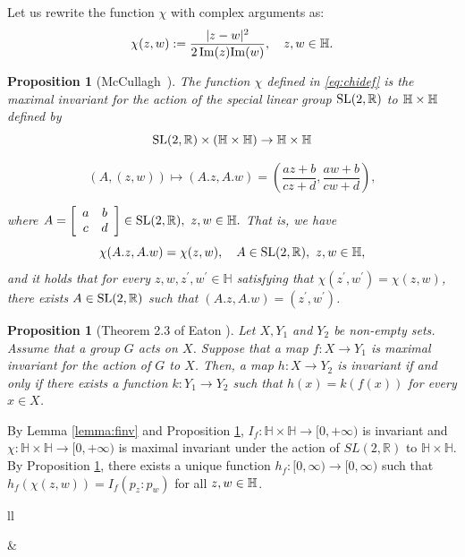 \documentclass[journal]{IEEEtran}
\newtheorem{proposition}[theorem]{Proposition}
\begin{document}
Let us rewrite the function $\chi$ with complex arguments as:
\begin{equation}\label{eq:chidef} 
\chi(z,w) := \frac{|z-w|^2}{2\,\Im(z) \Im(w)},\quad z,w\in\bbH. 
\end{equation}

\begin{proposition}[McCullagh~\cite{McCullagh1993}] \label{prop:McCullagh-mi}
The function $\chi$ defined in  \eqref{eq:chidef} is the {\em maximal invariant} for the action of the special linear group $\mathrm{SL}(2, {\mathbb{R}})$ 
to $\mathbb{H} \times \mathbb{H}$ defined by 
$$
\mathrm{SL}(2, {\mathbb{R}}) \times (\mathbb{H} \times \mathbb{H}) \to \mathbb{H} \times \mathbb{H}$$

$$
(A, (z,w)) \mapsto (A.z,A.w) = \left(\frac{az+b}{cz+d},  \frac{aw+b}{cw+d}\right),$$

where 
$
 A = \left[\begin{array}{cc}a & b\\ c & d\end{array}\right] \in \mathrm{SL}(2, {\mathbb{R}}), \ z, w \in \mathbb{H}.
$
That is, we have
$$
\chi(A.z, A.w) = \chi(z,w), \quad A \in \mathrm{SL}(2, {\mathbb{R}}), \ z, w  \in \mathbb{H},
$$
and it holds that for every $z, w, z^{\prime}, w^{\prime} \in \mathbb{H}$ satisfying that $\chi(z^{\prime}, w^{\prime}) = \chi(z,w)$, there exists $A \in \mathrm{SL}(2, {\mathbb{R}})$ such that $(A.z, A.w) = (z^{\prime}, w^{\prime})$. 
\end{proposition}

\begin{proposition}[Theorem 2.3 of Eaton \cite{Eaton-1989}]\label{prop:Eaton-mi}
Let $X, Y_1$ and $Y_2$ be non-empty sets. 
Assume that a group $G$ acts on $X$. 
Suppose that a map $f : X \to Y_1$ is maximal invariant for the action of $G$ to $X$. 
Then, a map $h : X \to Y_2$ is invariant if and only if there exists a function $k : Y_1 \to Y_2$ such that $h(x) = k(f(x))$ for every $x \in X$. 
\end{proposition}


By Lemma \ref{lemma:finv} and Proposition \ref{prop:McCullagh-mi}, 
$I_f : \mathbb{H} \times \mathbb{H} \to [0, +\infty)$ is invariant and $\chi : \mathbb{H} \times \mathbb{H} \to [0, +\infty)$ is maximal invariant under the action of $SL(2, \mathbb R)$ to $\mathbb{H} \times \mathbb{H}$. 
By Proposition \ref{prop:Eaton-mi}, 
there exists a unique function $h_f: [0, \infty)  \to [0, \infty)$ such that  $h_f(\chi(z,w))=I_f(p_z:p_w)$ for all $z,w\in\mathbb{H}$.
 
\begin{table}[htbp]\label{table:commutative}
\centering
\begin{tabular}{ll}
&
\begin{tikzcd}
\bbH\times\bbH \arrow[rd,"I_f"] \arrow[r, "\chi"] & \bbR_+ \arrow[d,"h_f"] \\
& \bbR_+  
\end{tikzcd}
\end{tabular}
\caption{Commutative diagrams which explain (left) Eaton's maximal invariant/invariant and (right) the $f$-divergence invariant function expressed as a function of the maximal invariant $\chi$: $I_f=h_f(\chi)$.}
\end{table}
 
\end{document}
